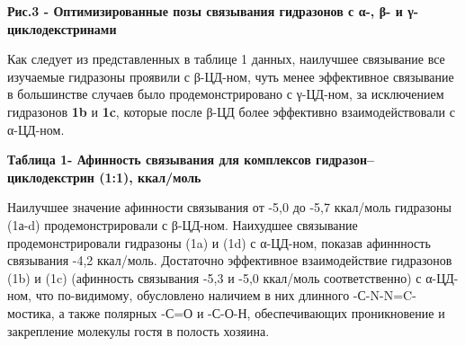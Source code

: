 {\bfseries Рис.3 - Оптимизированные позы связывания гидразонов с α-, β- и
γ-циклодекстринами}

Как следует из представленных в таблице 1 данных, наилучшее связывание
все изучаемые гидразоны проявили с β-ЦД-ном, чуть менее эффективное
связывание в большинстве случаев было продемонстрировано с γ-ЦД-ном, за
исключением гидразонов {\bfseries 1b} и {\bfseries 1c}, которые после β-ЦД
более эффективно взаимодействовали с α-ЦД-ном.

{\bfseries Таблица 1- Афинность связывания для комплексов
гидразон--циклодекстрин (1:1), ккал/моль}


Наилучшее значение афинности связывания от -5,0 до -5,7 ккал/моль
гидразоны (1а-d) продемонстрировали с β-ЦД-ном. Наихудшее связывание
продемонстрировали гидразоны (1a) и (1d) с α-ЦД-ном,
показав афиннность связывания -4,2 ккал/моль. Достаточно эффективное
взаимодействие гидразонов (1b) и (1c) (афинность связывания
-5,3 и -5,0 ккал/моль соответственно) с α-ЦД-ном, что по-видимому,
обусловлено наличием в них длинного -С-N-N=C- мостика, а также полярных
-С=О и -С-О-Н, обеспечивающих проникновение и закрепление молекулы гостя
в полость хозяина.

